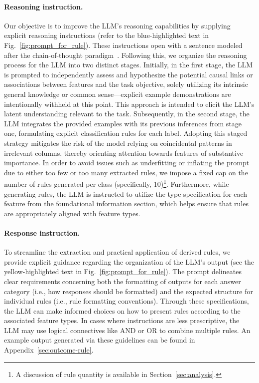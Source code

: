 \paragraph{Reasoning instruction.} Our objective is to improve the LLM's reasoning capabilities by supplying explicit reasoning instructions (refer to the blue-highlighted text in Fig.~\ref{fig:prompt_for_rule}). These instructions open with a sentence modeled after the chain-of-thought paradigm~\cite{wei2022chain}. Following this, we organize the reasoning process for the LLM into two distinct stages. Initially, in the first stage, the LLM is prompted to independently assess and hypothesize the potential causal links or associations between features and the task objective, solely utilizing its intrinsic general knowledge or common sense—explicit example demonstrations are intentionally withheld at this point. This approach is intended to elicit the LLM's latent understanding relevant to the task. Subsequently, in the second stage, the LLM integrates the provided examples with its previous inferences from stage one, formulating explicit classification rules for each label. Adopting this staged strategy mitigates the risk of the model relying on coincidental patterns in irrelevant columns, thereby orienting attention towards features of substantive importance. In order to avoid issues such as underfitting or inflating the prompt due to either too few or too many extracted rules, we impose a fixed cap on the number of rules generated per class (specifically, 10)\footnote{A discussion of rule quantity is available in Section~\ref{sec:analysis}.}. Furthermore, while generating rules, the LLM is instructed to utilize the type specification for each feature from the foundational information section, which helps ensure that rules are appropriately aligned with feature types.

\vspace*{-0.12in}
\paragraph{Response instruction.} To streamline the extraction and practical application of derived rules, we provide explicit guidance regarding the organization of the LLM’s output (see the yellow-highlighted text in Fig.~\ref{fig:prompt_for_rule}). The prompt delineates clear requirements concerning both the formatting of outputs for each answer category (i.e., how responses should be formatted) and the expected structure for individual rules (i.e., rule formatting conventions). Through these specifications, the LLM can make informed choices on how to present rules according to the associated feature types. In cases where instructions are less prescriptive, the LLM may use logical connectives like AND or OR to combine multiple rules. An example output generated via these guidelines can be found in Appendix~\ref{sec:outcome-rule}.

